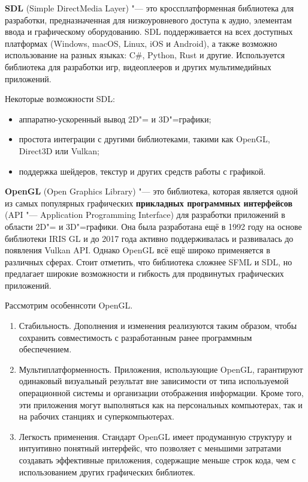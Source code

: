 \textbf{SDL} (Simple DirectMedia Layer) "--- это кроссплатформенная библиотека для разработки, предназначенная для низкоуровневого доступа к аудио, элементам ввода и графическому оборудованию. SDL поддерживается на всех доступных платформах (Windows, macOS, Linux, iOS и Android), а также возможно использование на разных языках: C\#, Python, Rust и другие. Используется библиотека для разработки игр, видеоплееров и других мультимедийных приложений\cite{sdl_doc}.

Некоторые возможности SDL:
\begin{itemize}
    \item аппаратно-ускоренный вывод 2D"= и 3D"=графики;
    \item простота интеграции с другими библиотеками, такими как OpenGL, \\ Direct3D или Vulkan;
    \item поддержка шейдеров, текстур и других средств работы с графикой. 
\end{itemize}

\textbf{OpenGL} (Open Graphics Library) "--- это библиотека, которая является одной из самых популярных графических \textbf{прикладных программных интерфейсов} (API "--- Application Programming Interface) для разработки приложений в области 2D"= и 3D"=графики. Она была разработана ещё в 1992 году на основе библиотеки IRIS GL и до 2017 года активно поддерживалась и развивалась до появления Vulkan API. Однако OpenGL всё ещё широко применяется в различных сферах. Стоит отметить, что библиотека сложнее SFML и SDL, но предлагает широкие возможности и гибкость для продвинутых графических приложений\cite{opengl_doc}.

Рассмотрим особеннсоти OpenGL.
\begin{enumerate}
    \item Стабильность. Дополнения и изменения реализуются таким образом, чтобы сохранить совместимость с разработанным ранее программным обеспечением.
    \item Мультиплатформенность. Приложения, использующие OpenGL, гарантируют одинаковый визуальный результат вне зависимости от типа используемой операционной системы и организации отображения информации. Кроме того, эти приложения могут выполняться как на персональных компьютерах, так и на рабочих станциях и суперкомпьютерах.
    \item Легкость применения. Стандарт OpenGL имеет продуманную структуру и интуитивно понятный интерфейс, что позволяет с меньшими затратами создавать эффективные приложения, содержащие меньше строк кода, чем с использованием других графических библиотек.
\end{enumerate}